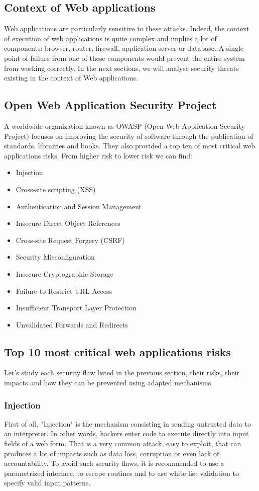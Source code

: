 \subsection{Context of Web applications}
Web applications are particularly sensitive to these attacks. Indeed, the
context of execution of web applications is quite complex and implies a lot of
components: browser, router, firewall, application server or database. A single
point of failure from one of these components would prevent the entire system
from working correctly. In the next sections, we will analyse security threats
existing in the context of Web applications.

\subsection{Open Web Application Security Project}
A worldwide organization known as OWASP (Open Web Application Security Project)
focuses on improving the security of software through the publication of
standards, librairies and books. They also provided a top ten of most critical
web applications risks. From higher risk to lower risk we can find:
\begin{itemize}{}
\item Injection
\item Cross-site scripting (XSS)
\item Authentication and Session Management
\item Insecure Direct Object References
\item Cross-site Request Forgery (CSRF)
\item Security Misconfiguration
\item Insecure Cryptographic Storage
\item Failure to Restrict URL Access
\item Insufficient Transport Layer Protection
\item Unvalidated Forwards and Redirects
\end{itemize}

\subsection{Top 10 most critical web applications risks}
Let's study each security flaw listed in the previous section, their risks,
their impacts and how they can be prevented using adapted mechanisms.

\subsubsection{Injection}
First of all, "Injection" is the mechanism consisting in sending untrusted data
to an interpreter. In other words, hackers enter code to execute directly into
input fields of a web form. That is a very common attack, easy to exploit, that
can produces a lot of impacts such as data loss, corruption or even lack of
accountability. To avoid such security flaws, it is recommended to use a
parametrized interface, to escape routines and to use white list validation to
specify valid input patterns.

